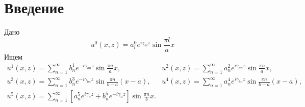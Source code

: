 \section{Введение}

Дано
$$
	u^0(x, z) = a_l^0 e^{i\gamma_{al}z}\sin{\frac{\pi l}{a}x}
$$
Ищем
$$
	\begin{array}{ll}
	u^1(x, z)=\sum\limits_{n=1}^{\infty}b_n^1e^{-i\gamma_{an}z}\sin{\frac{\pi n}{a}x},&
	u^2(x, z)=\sum\limits_{n=1}^{\infty}a_n^2e^{i\gamma_{an}z}\sin{\frac{\pi n}{a}x},\\
	u^3(x, z)=\sum\limits_{n=1}^{\infty}b_n^3e^{-i\gamma_{bn}z}\sin{\frac{\pi n}{b-a}(x-a)},&
	u^4(x, z)=\sum\limits_{n=1}^{\infty}a_n^4e^{i\gamma_{bn}z}\sin{\frac{\pi n}{b-a}(x-a)},\\
	u^5(x, z)=\sum\limits_{n=1}^{\infty}\left[a_n^5e^{i\gamma_{n}z}+b_n^5e^{-i\gamma_{n}z}\right]\sin{\frac{\pi n}{b}x}.&\\
	\end{array}
$$